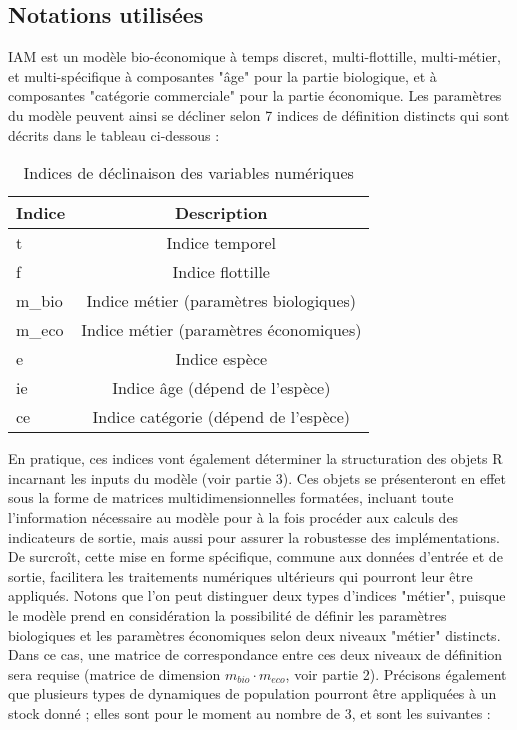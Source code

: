 \documentclass[12pt, colorinlistoftodos]{article}
\begin{document}
\subsection{Notations utilisées}

IAM est un modèle bio-économique à temps discret, multi-flottille, multi-métier, et multi-spécifique à composantes "âge"
 pour la partie biologique, et à composantes "catégorie commerciale" pour la partie économique. 
 Les paramètres du modèle peuvent ainsi se décliner selon 7 indices de définition distincts qui sont 
 décrits dans le tableau ci-dessous :

\begin{table}[h]
\centering
\begin{tabular}{|L| c |}
\hline
\textbf{Indice} & \textbf{Description} \\
 \hline
t & Indice temporel \\
f & Indice flottille \\
m_{bio} & Indice métier (paramètres biologiques) \\
m_{eco} & Indice métier (paramètres économiques) \\
e & Indice espèce \\
ie & Indice âge (dépend de l’espèce) \\
ce & Indice catégorie (dépend de l’espèce) \\
\hline
\end{tabular}
\label{neat}
\caption{Indices de déclinaison des variables numériques}
\end{table}

En pratique, ces indices vont également déterminer la structuration des objets R incarnant les inputs du modèle 
(voir partie 3). Ces objets se présenteront en effet sous la forme de matrices multidimensionnelles formatées, 
incluant toute l'information nécessaire au modèle pour à la fois procéder aux calculs des indicateurs de sortie, 
mais aussi pour assurer la robustesse des implémentations. De surcroît, cette mise en forme spécifique, 
commune aux données d'entrée et de sortie, facilitera les traitements numériques ultérieurs qui pourront 
leur être appliqués. Notons que l'on peut distinguer deux types d'indices "métier", puisque le modèle 
prend en considération la possibilité de définir les paramètres biologiques et les paramètres économiques 
selon deux niveaux "métier" distincts. Dans ce cas, une matrice de correspondance entre ces deux niveaux de 
définition sera requise (matrice de dimension $m_{bio} \cdot m_{eco}$, voir partie 2). Précisons également que plusieurs 
types de dynamiques de population pourront être appliquées à un stock donné ; elles sont pour le moment 
au nombre de 3, et sont les suivantes :
\end{document}
